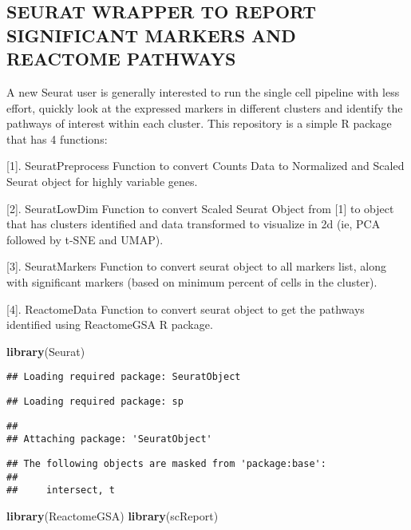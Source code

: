 \documentclass[
]{article}
\author{}
\date{\vspace{-2.5em}}
\newenvironment{Shaded}{\begin{snugshade}}{\end{snugshade}}
\newcommand{\FunctionTok}[1]{\textcolor[rgb]{0.13,0.29,0.53}{\textbf{#1}}}
\newcommand{\NormalTok}[1]{#1}
\begin{document}
\subsection{SEURAT WRAPPER TO REPORT SIGNIFICANT MARKERS AND REACTOME
PATHWAYS}\label{seurat-wrapper-to-report-significant-markers-and-reactome-pathways}

A new Seurat user is generally interested to run the single cell
pipeline with less effort, quickly look at the expressed markers in
different clusters and identify the pathways of interest within each
cluster. This repository is a simple R package that has 4 functions:

{[}1{]}. SeuratPreprocess Function to convert Counts Data to Normalized
and Scaled Seurat object for highly variable genes.

{[}2{]}. SeuratLowDim Function to convert Scaled Seurat Object from
{[}1{]} to object that has clusters identified and data transformed to
visualize in 2d (ie, PCA followed by t-SNE and UMAP).

{[}3{]}. SeuratMarkers Function to convert seurat object to all markers
list, along with significant markers (based on minimum percent of cells
in the cluster).

{[}4{]}. ReactomeData Function to convert seurat object to get the
pathways identified using ReactomeGSA R package.

\begin{Shaded}
\begin{Highlighting}[]
\FunctionTok{library}\NormalTok{(Seurat)}
\end{Highlighting}
\end{Shaded}

\begin{verbatim}
## Loading required package: SeuratObject
\end{verbatim}

\begin{verbatim}
## Loading required package: sp
\end{verbatim}

\begin{verbatim}
## 
## Attaching package: 'SeuratObject'
\end{verbatim}

\begin{verbatim}
## The following objects are masked from 'package:base':
## 
##     intersect, t
\end{verbatim}

\begin{Shaded}
\begin{Highlighting}[]
\FunctionTok{library}\NormalTok{(ReactomeGSA)}
\FunctionTok{library}\NormalTok{(scReport)}
\end{Highlighting}
\end{Shaded}
\end{document}
